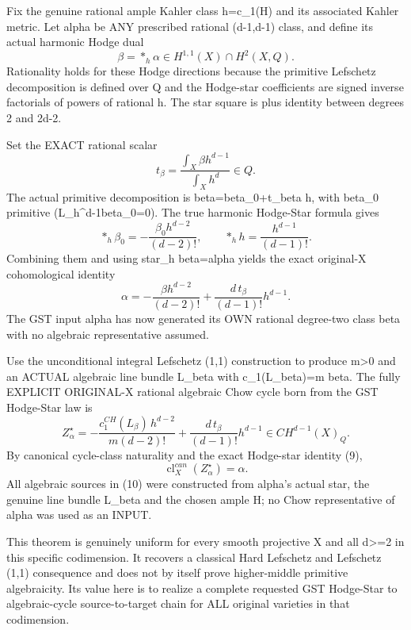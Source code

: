 \documentclass[11pt]{article}
\begin{document}
Fix the genuine rational ample Kahler class
h=c_1(H) and its associated Kahler metric.
Let alpha be ANY prescribed rational
(d-1,d-1) class, and define its actual
harmonic Hodge dual
\[
\boxed{\beta=*_h\alpha\in
H^{1,1}(X)\cap H^2(X,Q).}
\]
Rationality holds for these Hodge
directions because the primitive
Lefschetz decomposition is defined
over Q and the Hodge-star
coefficients are signed inverse
factorials of powers of rational h.
The star square is plus identity
between degrees 2 and 2d-2.

Set the EXACT rational scalar
\[
t_\beta=
\frac{\int_X\beta h^{d-1}}
     {\int_X h^d}\in Q.
\]
The actual primitive decomposition is
beta=beta_0+t_beta h, with beta_0 primitive
(L_h^{d-1}beta_0=0).
The true harmonic Hodge-Star formula gives
\[
*_h \beta_0
=-\frac{\beta_0 h^{d-2}}{(d-2)!},
\qquad
*_h h=\frac{h^{d-1}}{(d-1)!}.
\]
Combining them and using
star_h beta=alpha yields the exact
original-X cohomological identity
\[
\boxed{
\alpha=-\frac{\beta h^{d-2}}{(d-2)!}
+\frac{d\,t_\beta}{(d-1)!}h^{d-1}.
}\tag{9}
\]
The GST input alpha has now
generated its OWN rational
degree-two class beta with
no algebraic representative assumed.

Use the unconditional integral
Lefschetz (1,1) construction to
produce m>0 and an ACTUAL algebraic
line bundle L_beta with
c_1(L_beta)=m beta.
The fully EXPLICIT ORIGINAL-X
rational algebraic Chow cycle
born from the GST Hodge-Star law is
\[
\boxed{
Z^{\star}_{\alpha}=
-\frac{c_1^{CH}(L_\beta)\,h^{d-2}}
 {m(d-2)!}
+\frac{d\,t_\beta}{(d-1)!}h^{d-1}
\in CH^{d-1}(X)_Q.
}\tag{10}
\]
By canonical cycle-class naturality
and the exact Hodge-star identity (9),
\[
\boxed{\operatorname{cl}^{can}_X
(Z^\star_\alpha)=\alpha.}
\]
All algebraic sources in (10) were
constructed from alpha's actual star,
the genuine line bundle L_beta and
the chosen ample H; no Chow representative
of alpha was used as an INPUT.

This theorem is genuinely uniform
for every smooth projective X and
all d>=2 in this specific codimension.
It recovers a classical Hard Lefschetz
and Lefschetz (1,1) consequence and
does not by itself prove higher-middle
primitive algebraicity. Its value
here is to realize a complete requested
GST Hodge-Star to algebraic-cycle
source-to-target chain for ALL
original varieties in that codimension.
\end{document}
